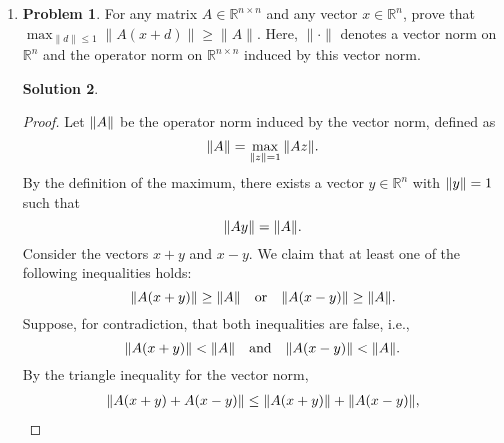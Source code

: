 \documentclass[12pt]{article}
\theoremstyle{definition}
\newtheorem*{solution}{\normalfont\textbf{Solution}}
\newtheorem*{Problem}{\noindent\textbf{Problem}}
\begin{document}
\begin{enumerate}[leftmargin=*]
\begin{solution}
\begin{itemize}
            \item \textit{Non-monotonic case 2}: \( A = \begin{bmatrix} 1 & 4 \\ 2 & 3 \end{bmatrix} \)
            \begin{align*}
            \|A\|_1 &= \max(3, 7) = 7, \\
            \|A\|_2 &= \sqrt{\frac{23 + \sqrt{221}}{2}} \approx 5.549, \\
            \|A\|_\infty &= \max(5, 5) = 5.
            \end{align*}
            Thus \( \|A\|_1 = 7 > \|A\|_2 \approx 5.549 > \|A\|_\infty = 5 \).
            \end{itemize}
            The norms exhibit non-monotonic behavior in both directions.
        \end{solution}
    \item \begin{Problem}
            For any matrix \( A \in \mathbb{R}^{n \times n} \) and any vector \( x \in \mathbb{R}^n \), prove that \( \max_{\|d\| \leq 1} \|A(x + d)\| \geq \|A\| \). Here, \( \|\cdot\| \) denotes a vector norm on \( \mathbb{R}^n \) and the operator norm on \( \mathbb{R}^{n \times n} \) induced by this vector norm.
        \end{Problem}
        \begin{solution}
            \begin{proof}
                Let \( \norm{A} \) be the operator norm induced by the vector norm, defined as
                \[
                \norm{A} = \max_{\norm{z} = 1} \norm{A z}.
                \]
                By the definition of the maximum, there exists a vector \( y \in \mathbb{R}^n \) with \( \norm{y} = 1 \) such that
                \[
                \norm{A y} = \norm{A}.
                \]
                Consider the vectors \( x + y \) and \( x - y \). We claim that at least one of the following inequalities holds:
                \[
                \norm{A(x + y)} \geq \norm{A} \quad \text{or} \quad \norm{A(x - y)} \geq \norm{A}.
                \]
                Suppose, for contradiction, that both inequalities are false, i.e.,
                \[
                \norm{A(x + y)} < \norm{A} \quad \text{and} \quad \norm{A(x - y)} < \norm{A}.
                \]
                By the triangle inequality for the vector norm,
                \begin{align*}
                \norm{A(x + y) + A(x - y)} &\leq \norm{A(x + y)} + \norm{A(x - y)}, \\

\end{align*}
\end{proof}
\end{solution}
\end{enumerate}
\end{document}
